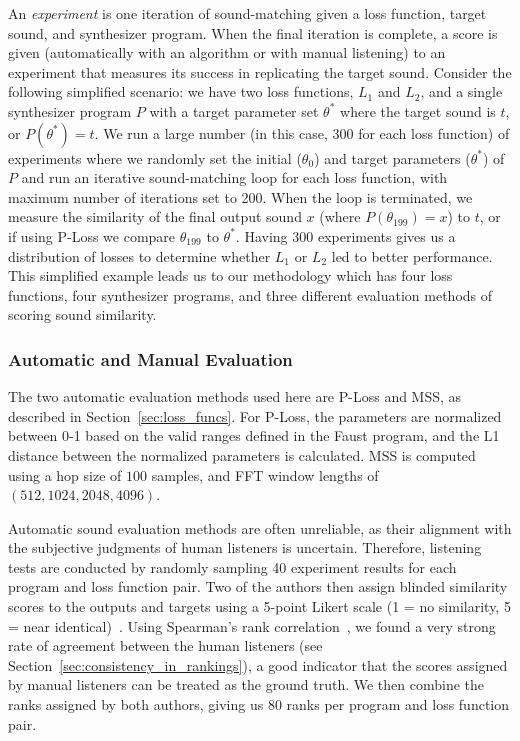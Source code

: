 \documentclass[lettersize,journal]{IEEEtran}
\begin{document}
An \textit{experiment} is one iteration of sound-matching given a loss function, target sound,
and synthesizer program. When the final iteration is complete, a score is given (automatically with an algorithm or with manual listening) to an experiment that measures its success in replicating the target sound. Consider the following simplified scenario: we have two loss functions, $L_1$ and $L_2$, and a single synthesizer program $P$ with a target parameter set $\theta^*$ where the target sound is $t$, or $P(\theta^*) = t$. We run a large number (in this case, 300 for each loss function) of experiments where we randomly set the initial ($\theta_0$) and target parameters ($\theta^*$) of $P$ and run an iterative sound-matching loop for each loss function, with maximum number of iterations set to 200. When the loop is terminated, we measure the similarity of the final output sound $x$ (where $P(\theta_{199}) = x$) to $t$, or if using P-Loss we compare $\theta_{199}$ to $\theta^*$. Having 300 experiments gives us a distribution of losses to determine whether $L_1$ or $L_2$ led to better performance. This simplified example leads us to our methodology which has four loss functions, four synthesizer programs, and three different evaluation methods of scoring sound similarity.

\subsubsection{Automatic and Manual Evaluation}
\label{sec:evaluation_manual_auto}
The two automatic evaluation methods used here are P-Loss and MSS, as described in Section~\ref{sec:loss_funcs}. For P-Loss, the parameters are normalized between 0-1 based on the valid ranges defined in the Faust program, and the L1 distance between the normalized parameters is calculated. MSS is computed using a hop size of $100$ samples, and FFT window lengths of $(512, 1024, 2048, 4096)$. 

Automatic sound evaluation methods are often unreliable, as their alignment with the subjective judgments of human listeners is uncertain. Therefore, listening tests are conducted by randomly sampling 40 experiment results for each program and loss function pair. Two of the authors then assign blinded similarity scores to the outputs and targets using a 5-point Likert scale (1 = no similarity, 5 = near identical)~\cite{jebb2021review}. Using Spearman's rank correlation~\cite{spearman1987proof,rebekic2015pearson}, we found a very strong rate of agreement between the human listeners (see Section~\ref{sec:consistency_in_rankings}), a good indicator that the scores assigned by manual listeners can be treated as the ground truth. We then combine the ranks assigned by both authors, giving us 80 ranks per program and loss function pair. 
\end{document}
